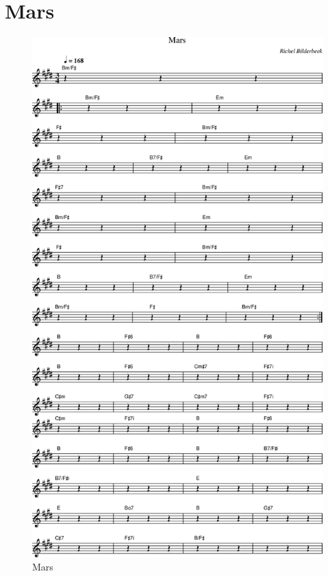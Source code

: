 \chapter{Mars}



\begin{figure}[!htbp]
  \includegraphics[width=\textwidth,height=\textheight,keepaspectratio]{../songs/61_mars.png}
  \caption{Mars}
  \label{fig:61_mars}
\end{figure}
